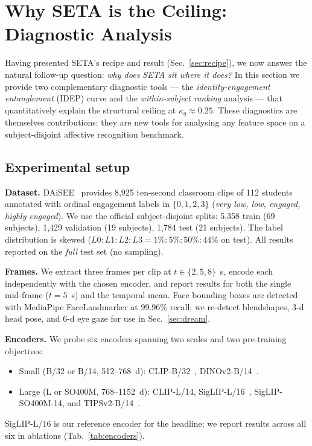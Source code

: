 \section{Why SETA is the Ceiling: Diagnostic Analysis}
\label{sec:ceiling}

Having presented SETA's recipe and result (Sec.~\ref{sec:recipe}),
we now answer the natural follow-up question: \emph{why does SETA
sit where it does?} In this section we provide two complementary
diagnostic tools --- the \emph{identity-engagement entanglement}
(IDEP) curve and the \emph{within-subject ranking} analysis ---
that quantitatively explain the structural ceiling at
$\kappa_q \approx 0.25$. These diagnostics are themselves
contributions: they are new tools for analysing any feature space
on a subject-disjoint affective recognition benchmark.

\subsection{Experimental setup}
\label{sec:setup}

\textbf{Dataset.} DAiSEE~\cite{gupta2016daisee} provides 8,925
ten-second classroom clips of 112 students annotated with ordinal
engagement labels in $\{0, 1, 2, 3\}$ (\emph{very low, low,
engaged, highly engaged}). We use the official subject-disjoint
splits: 5,358 train (69 subjects), 1,429 validation (19 subjects),
1,784 test (21 subjects). The label distribution is skewed
($L0{:}L1{:}L2{:}L3 = 1\%{:}5\%{:}50\%{:}44\%$ on test). All
results reported on the \emph{full} test set (no sampling).

\textbf{Frames.} We extract three frames per clip at
$t \in \{2, 5, 8\}$~s, encode each independently with the chosen
encoder, and report results for both the single mid-frame ($t=5$~s)
and the temporal mean. Face bounding boxes are detected with
MediaPipe FaceLandmarker at 99.96\% recall; we re-detect blendshapes,
3-d head pose, and 6-d eye gaze for use in
Sec.~\ref{sec:dream}.

\textbf{Encoders.} We probe six encoders spanning two scales and
two pre-training objectives:
\begin{itemize}\itemsep0pt
  \item Small (B/32 or B/14, 512--768~d):
  CLIP-B/32~\cite{radford2021clip}, DINOv2-B/14~\cite{oquab2023dinov2}.
  \item Large (L or SO400M, 768--1152~d): CLIP-L/14,
  SigLIP-L/16~\cite{zhai2023siglip}, SigLIP-SO400M-14, and
  TIPSv2-B/14~\cite{cao2026tipsv2}.
\end{itemize}
SigLIP-L/16 is our reference encoder for the headline; we report
results across all six in ablations (Tab.~\ref{tab:encoders}).


